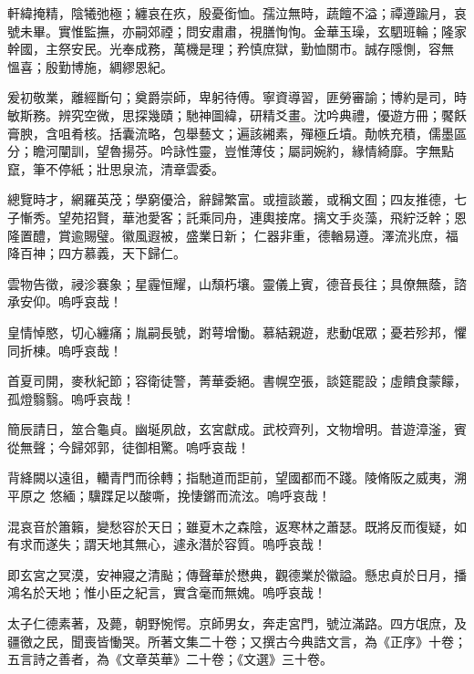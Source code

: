 \begin{pinyinscope}
 軒緯掩精，陰犧弛極；纏哀在疚，殷憂銜恤。孺泣無時，蔬饘不溢；禫遵踰月，哀號未畢。實惟監撫，亦嗣郊禋；問安肅肅，視膳恂恂。金華玉璪，玄駟班輪；隆家幹國，主祭安民。光奉成務，萬機是理；矜慎庶獄，勤恤關市。誠存隱惻，容無
 慍喜；殷勤博施，綢繆恩紀。



 爰初敬業，離經斷句；奠爵崇師，卑躬待傅。寧資導習，匪勞審諭；博約是司，時敏斯務。辨究空微，思探幾賾；馳神圖緯，研精爻畫。沈吟典禮，優遊方冊；饜飫膏腴，含咀肴核。括囊流略，包舉藝文；遍該緗素，殫極丘墳。勣帙充積，儒墨區分；瞻河闡訓，望魯揚芬。吟詠性靈，豈惟薄伎；屬詞婉約，緣情綺靡。字無點竄，筆不停紙；壯思泉流，清章雲委。



 總覽時才，網羅英茂；學窮優洽，辭歸繁富。或擅談叢，或稱文囿；四友推德，七子慚秀。望苑招賢，華池愛客；託乘同舟，連輿接席。摛文手炎藻，飛紵泛幹；恩隆置醴，賞逾賜璧。徽風遐被，盛業日新；
 仁器非重，德輶易遵。澤流兆庶，福降百神；四方慕義，天下歸仁。



 雲物告徵，祲沴褰象；星霾恒耀，山頹朽壤。靈儀上賓，德音長往；具僚無蔭，諮承安仰。嗚呼哀哉！



 皇情悼愍，切心纏痛；胤嗣長號，跗萼增慟。慕結親遊，悲動氓眾；憂若殄邦，懼同折棟。嗚呼哀哉！



 首夏司開，麥秋紀節；容衛徒警，菁華委絕。書幌空張，談筵罷設；虛饋食蒙饛，孤燈翳翳。嗚呼哀哉！



 簡辰請日，筮合龜貞。幽埏夙啟，玄宮獻成。武校齊列，文物增明。昔遊漳滏，賓從無聲；今歸郊郭，徒御相驚。嗚呼哀哉！



 背絳闕以遠徂，轥青門而徐轉；指馳道而詎前，望國都而不踐。陵脩阪之威夷，溯平原之
 悠緬；驥蹀足以酸嘶，挽悽鏘而流泫。嗚呼哀哉！



 混哀音於簫籟，變愁容於天日；雖夏木之森陰，返寒林之蕭瑟。既將反而復疑，如有求而遂失；謂天地其無心，遽永潛於容質。嗚呼哀哉！



 即玄宮之冥漠，安神寢之清颭；傳聲華於懋典，觀德業於徽謚。懸忠貞於日月，播鴻名於天地；惟小臣之紀言，實含毫而無媿。嗚呼哀哉！



 太子仁德素著，及薨，朝野惋愕。京師男女，奔走宮門，號泣滿路。四方氓庶，及疆徼之民，聞喪皆慟哭。所著文集二十卷；又撰古今典誥文言，為《正序》十卷；五言詩之善者，為《文章英華》二十卷；《文選》三十卷。




\end{pinyinscope}

